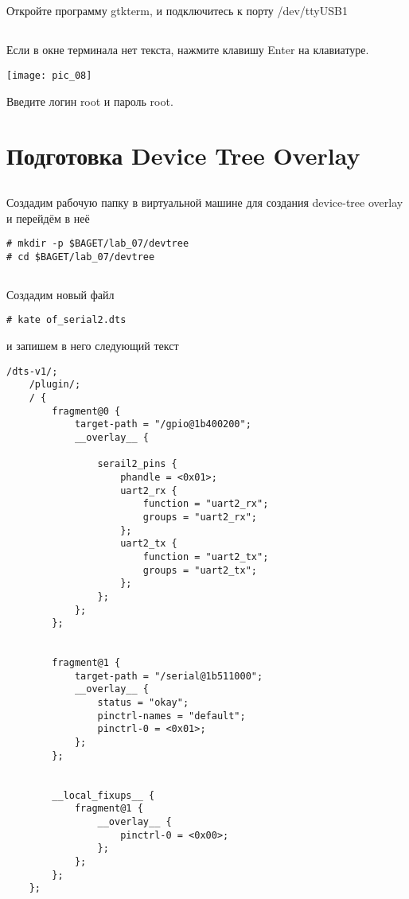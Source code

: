 \subsection{}Откройте программу gtkterm, и подключитесь к порту /dev/ttyUSB1

\subsection{}Если в окне терминала нет текста, нажмите клавишу Enter на клавиатуре.
\begin{center}
	\texttt{[image: pic\_08]}
\end{center}
Введите логин root и пароль root.


\section{Подготовка Device Tree Overlay}

\subsection{} Создадим рабочую папку в виртуальной машине для создания device-tree overlay и перейдём в неё 
\begin{lstlisting}[style=bash]
# mkdir -p $BAGET/lab_07/devtree
# cd $BAGET/lab_07/devtree 
\end{lstlisting}

\subsection{}Создадим новый файл
\begin{lstlisting}[style=bash]
# kate of_serial2.dts
\end{lstlisting}
и запишем в него следующий текст
\begin{lstlisting}[style=stdout]
	/dts-v1/;
	/plugin/;
	/ {
		fragment@0 {
			target-path = "/gpio@1b400200";
			__overlay__ {
				
				serail2_pins {
					phandle = <0x01>;
					uart2_rx {
						function = "uart2_rx";
						groups = "uart2_rx";
					};
					uart2_tx {
						function = "uart2_tx";
						groups = "uart2_tx";
					};
				};
			};
		};
		
		
		fragment@1 { 
			target-path = "/serial@1b511000"; 
			__overlay__ { 
				status = "okay"; 
				pinctrl-names = "default"; 
				pinctrl-0 = <0x01>; 
			}; 
		}; 
		
		
		__local_fixups__ {
			fragment@1 {
				__overlay__ {
					pinctrl-0 = <0x00>;
				};
			};	
		};
	};
\end{lstlisting}

